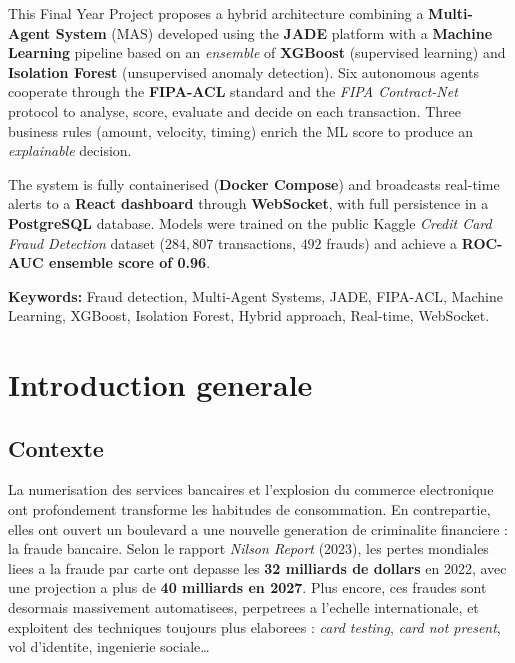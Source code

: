 \documentclass[12pt,a4paper,oneside]{report}
\begin{document}
This Final Year Project proposes a hybrid architecture combining a
\textbf{Multi-Agent System} (MAS) developed using the \textbf{JADE} platform
with a \textbf{Machine Learning} pipeline based on an \emph{ensemble} of
\textbf{XGBoost} (supervised learning) and \textbf{Isolation Forest}
(unsupervised anomaly detection). Six autonomous agents cooperate through the
\textbf{FIPA-ACL} standard and the \emph{FIPA Contract-Net} protocol to
analyse, score, evaluate and decide on each transaction. Three business rules
(amount, velocity, timing) enrich the ML score to produce an
\emph{explainable} decision.

The system is fully containerised (\textbf{Docker Compose}) and broadcasts
real-time alerts to a \textbf{React dashboard} through \textbf{WebSocket}, with
full persistence in a \textbf{PostgreSQL} database. Models were trained on the
public Kaggle \emph{Credit Card Fraud Detection} dataset ($284{,}807$
transactions, $492$ frauds) and achieve a \textbf{ROC-AUC ensemble score of
0.96}.

\noindent\textbf{Keywords:} Fraud detection, Multi-Agent Systems, JADE,
FIPA-ACL, Machine Learning, XGBoost, Isolation Forest, Hybrid approach,
Real-time, WebSocket.

\tableofcontents
\listoffigures
\listoftables

\chapter*{Introduction generale}

\section*{Contexte}

La numerisation des services bancaires et l'explosion du commerce electronique
ont profondement transforme les habitudes de consommation. En contrepartie,
elles ont ouvert un boulevard a une nouvelle generation de criminalite
financiere : la fraude bancaire. Selon le rapport \emph{Nilson Report} (2023),
les pertes mondiales liees a la fraude par carte ont depasse les
\textbf{32 milliards de dollars} en 2022, avec une projection a plus de
\textbf{40 milliards en 2027}. Plus encore, ces fraudes sont desormais
massivement automatisees, perpetrees a l'echelle internationale, et exploitent
des techniques toujours plus elaborees : \emph{card testing}, \emph{card not
present}, vol d'identite, ingenierie sociale\dots
\end{document}
